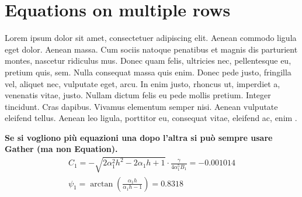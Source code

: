 
\section{Equations on multiple rows}

Lorem ipsum dolor sit amet, consectetuer adipiscing elit. Aenean commodo ligula eget dolor. Aenean massa. Cum sociis natoque penatibus et magnis dis parturient montes, nascetur ridiculus mus. Donec quam felis, ultricies nec, pellentesque eu, pretium quis, sem. Nulla consequat massa quis enim. Donec pede justo, fringilla vel, aliquet nec, vulputate eget, arcu. In enim justo, rhoncus ut, imperdiet a, venenatis vitae, justo. Nullam dictum felis eu pede mollis pretium. Integer tincidunt. Cras dapibus. Vivamus elementum semper nisi. Aenean vulputate eleifend tellus. Aenean leo ligula, porttitor eu, consequat vitae, eleifend ac, enim \cite{ref2}.

\textbf{Se si vogliono più equazioni una dopo l'altra si può sempre usare Gather (ma non Equation).}
\begin{gather*}
    C_1 = -\sqrt{2\alpha_1 ^2 h^2 - 2 \alpha_1 h + 1} \cdot \frac{\gamma}{4 \alpha_1^5 B_1} = -0.001014\\
    \psi_1 = \arctan{\left( \frac{\alpha_1 h}{\alpha_1 h - 1} \right)} = 0.8318 
\end{gather*}

